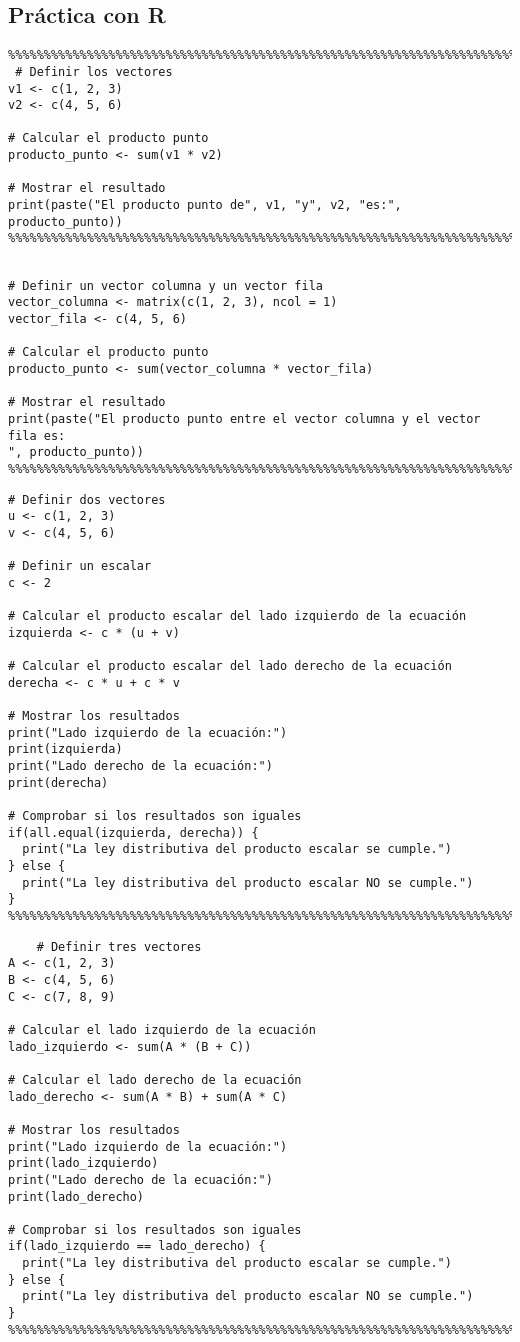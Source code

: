 \subsection{Práctica con R}
\begin{verbatim}
%%%%%%%%%%%%%%%%%%%%%%%%%%%%%%%%%%%%%%%%%%%%%%%%%%%%%%%%%%%%%%%%%%%%%%%
 # Definir los vectores
v1 <- c(1, 2, 3)
v2 <- c(4, 5, 6)

# Calcular el producto punto
producto_punto <- sum(v1 * v2)

# Mostrar el resultado
print(paste("El producto punto de", v1, "y", v2, "es:", producto_punto))  
%%%%%%%%%%%%%%%%%%%%%%%%%%%%%%%%%%%%%%%%%%%%%%%%%%%%%%%%%%%%%%%%%%%%%%%
\end{verbatim}
\begin{verbatim}

# Definir un vector columna y un vector fila
vector_columna <- matrix(c(1, 2, 3), ncol = 1)
vector_fila <- c(4, 5, 6)

# Calcular el producto punto
producto_punto <- sum(vector_columna * vector_fila)

# Mostrar el resultado
print(paste("El producto punto entre el vector columna y el vector fila es:
", producto_punto))    
%%%%%%%%%%%%%%%%%%%%%%%%%%%%%%%%%%%%%%%%%%%%%%%%%%%%%%%%%%%%%%%%%%%%%%%
\end{verbatim}
\begin{verbatim}
# Definir dos vectores
u <- c(1, 2, 3)
v <- c(4, 5, 6)

# Definir un escalar
c <- 2

# Calcular el producto escalar del lado izquierdo de la ecuación
izquierda <- c * (u + v)

# Calcular el producto escalar del lado derecho de la ecuación
derecha <- c * u + c * v

# Mostrar los resultados
print("Lado izquierdo de la ecuación:")
print(izquierda)
print("Lado derecho de la ecuación:")
print(derecha)

# Comprobar si los resultados son iguales
if(all.equal(izquierda, derecha)) {
  print("La ley distributiva del producto escalar se cumple.")
} else {
  print("La ley distributiva del producto escalar NO se cumple.")
}
%%%%%%%%%%%%%%%%%%%%%%%%%%%%%%%%%%%%%%%%%%%%%%%%%%%%%%%%%%%%%%%%%%%%%%%    
\end{verbatim}
\begin{verbatim}
    # Definir tres vectores
A <- c(1, 2, 3)
B <- c(4, 5, 6)
C <- c(7, 8, 9)

# Calcular el lado izquierdo de la ecuación
lado_izquierdo <- sum(A * (B + C))

# Calcular el lado derecho de la ecuación
lado_derecho <- sum(A * B) + sum(A * C)

# Mostrar los resultados
print("Lado izquierdo de la ecuación:")
print(lado_izquierdo)
print("Lado derecho de la ecuación:")
print(lado_derecho)

# Comprobar si los resultados son iguales
if(lado_izquierdo == lado_derecho) {
  print("La ley distributiva del producto escalar se cumple.")
} else {
  print("La ley distributiva del producto escalar NO se cumple.")
}
%%%%%%%%%%%%%%%%%%%%%%%%%%%%%%%%%%%%%%%%%%%%%%%%%%%%%%%%%%%%%%%%%%%%%%%
\end{verbatim}

